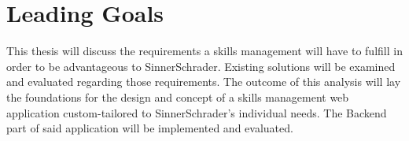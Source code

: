 \section{Leading Goals}
This thesis will discuss the requirements a skills management will have to fulfill in order to be advantageous to SinnerSchrader. Existing solutions will be examined and evaluated regarding those requirements. The outcome of this analysis will lay the foundations for the design and concept of a skills management web application custom-tailored to SinnerSchrader's individual needs. The Backend part of said application will be implemented and evaluated.
